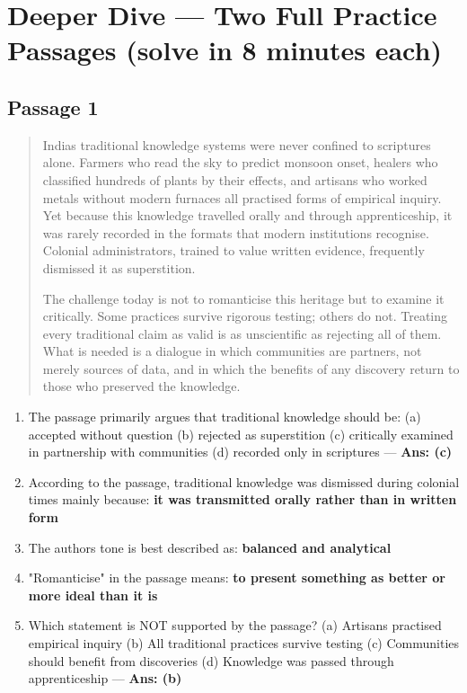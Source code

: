 \needspace{131pt}

\hypertarget{p1-03--deeper-dive--two-full-practice-passages-solve-in-8-minutes-each}{%
\section{Deeper Dive --- Two Full Practice Passages (solve in 8 minutes each)}\label{p1-03--deeper-dive--two-full-practice-passages-solve-in-8-minutes-each}}

\needspace{95pt}

\hypertarget{p1-03--passage-1}{%
\subsection{Passage 1}\label{p1-03--passage-1}}

\begin{quote}
India\textquotesingle s traditional knowledge systems were never confined to scriptures alone. Farmers who read the
sky to predict monsoon onset, healers who classified hundreds of plants by their effects, and
artisans who worked metals without modern furnaces all practised forms of empirical inquiry. Yet
because this knowledge travelled orally and through apprenticeship, it was rarely recorded in the
formats that modern institutions recognise. Colonial administrators, trained to value written
evidence, frequently dismissed it as superstition.

The challenge today is not to romanticise this heritage but to examine it critically. Some practices
survive rigorous testing; others do not. Treating every traditional claim as valid is as unscientific
as rejecting all of them. What is needed is a dialogue in which communities are partners, not merely
sources of data, and in which the benefits of any discovery return to those who preserved the knowledge.
\end{quote}

\begin{enumerate}
\def\labelenumi{\arabic{enumi}.}
\tightlist
\item
  The passage primarily argues that traditional knowledge should be:
  (a) accepted without question (b) rejected as superstition (c) critically examined in partnership with communities (d) recorded only in scriptures --- \textbf{Ans: (c)}
\item
  According to the passage, traditional knowledge was dismissed during colonial times mainly because:
  \textbf{it was transmitted orally rather than in written form}
\item
  The author\textquotesingle s tone is best described as: \textbf{balanced and analytical}
\item
  "Romanticise" in the passage means: \textbf{to present something as better or more ideal than it is}
\item
  Which statement is NOT supported by the passage?
  (a) Artisans practised empirical inquiry (b) All traditional practices survive testing (c) Communities should benefit from discoveries (d) Knowledge was passed through apprenticeship --- \textbf{Ans: (b)}
\end{enumerate}

